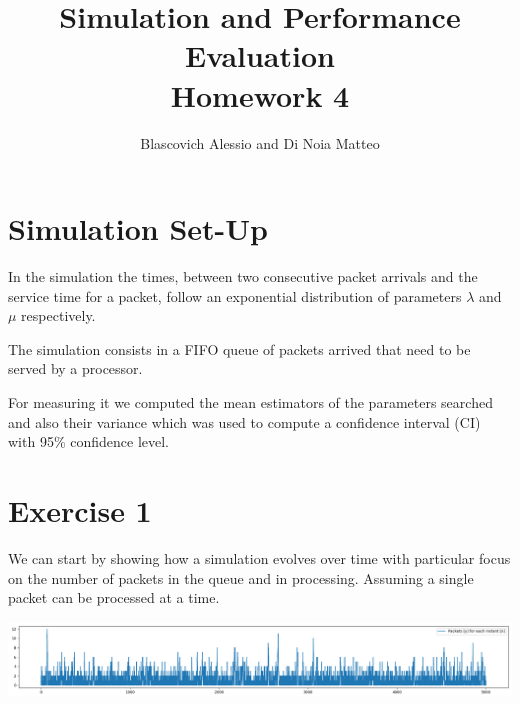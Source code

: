 \documentclass[10pt,a4paper]{article}
\title{
  {\Huge Simulation and Performance Evaluation}\\
  \huge Homework 4\\
}
\author{Blascovich Alessio and Di Noia Matteo}
\begin{document}
\maketitle

\section*{Simulation Set-Up}

In the simulation the times, between two consecutive packet arrivals and the service time for a packet, follow an exponential distribution of parameters \(\lambda\) and \(\mu\) respectively.

The simulation consists in a FIFO queue of packets arrived that need to be served by a processor.

For measuring it we computed the mean estimators of the parameters searched and also their variance which was used to compute a confidence interval (CI) with 95\% confidence level.

\section*{Exercise 1}

We can start by showing how a simulation evolves over time with particular focus on the number of packets in the queue and in processing. Assuming a single packet can be processed at a time.

\begin{center}
  \includegraphics[width=\textwidth]{whole-simulation.png}
\end{center}
\end{document}
